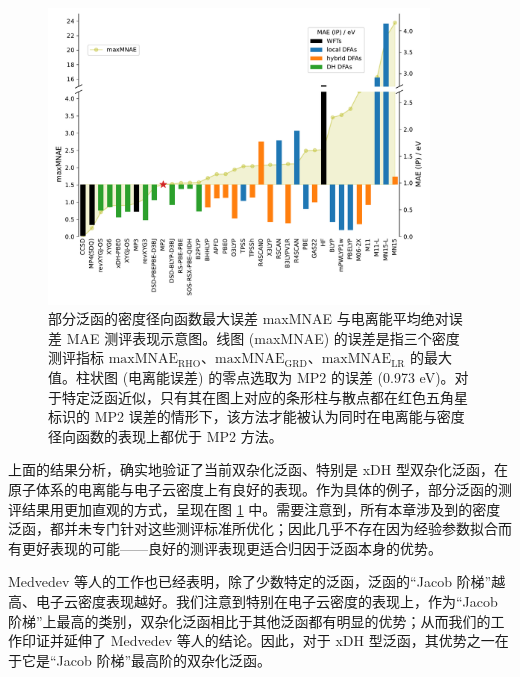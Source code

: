 \begin{figure}[t]
    \centering
    \includegraphics[width=0.9\textwidth]{assets/compare-err-relative.pdf}
    \caption[部分泛函密度径向函数 maxMNAE 与电离能 MAE 测评表现示意图]{部分泛函的密度径向函数最大误差 maxMNAE 与电离能平均绝对误差 MAE 测评表现示意图。线图 (maxMNAE) 的误差是指三个密度测评指标 $\text{maxMNAE}_\text{RHO}$、$\text{maxMNAE}_\text{GRD}$、$\text{maxMNAE}_\text{LR}$ 的最大值。柱状图 (电离能误差) 的零点选取为 MP2 的误差 (0.973 eV)。对于特定泛函近似，只有其在图上对应的条形柱与散点都在红色五角星标识的 MP2 误差的情形下，该方法才能被认为同时在电离能与密度径向函数的表现上都优于 MP2 方法。}
    \label{fig.4.compare-err-relative}
\end{figure}

上面的结果分析，确实地验证了当前双杂化泛函、特别是 xDH 型双杂化泛函，在原子体系的电离能与电子云密度上有良好的表现。作为具体的例子，部分泛函的测评结果用更加直观的方式，呈现在图 \ref{fig.4.compare-err-relative} 中。需要注意到，所有本章涉及到的密度泛函，都并未专门针对这些测评标准所优化；因此几乎不存在因为经验参数拟合而有更好表现的可能——良好的测评表现更适合归因于泛函本身的优势。

Medvedev 等人的工作也已经表明，除了少数特定的泛函，泛函的“Jacob 阶梯”越高、电子云密度表现越好。我们注意到特别在电子云密度的表现上，作为“Jacob 阶梯”上最高的类别，双杂化泛函相比于其他泛函都有明显的优势；从而我们的工作印证并延伸了 Medvedev 等人的结论。因此，对于 xDH 型泛函，其优势之一在于它是“Jacob 阶梯”最高阶的双杂化泛函。

